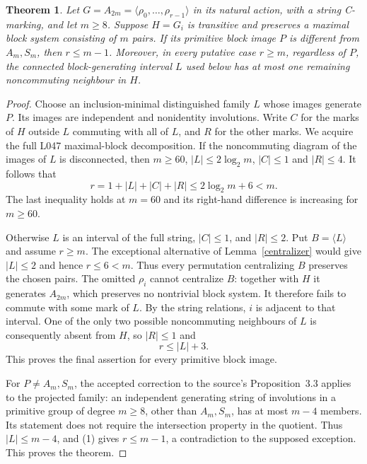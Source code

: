 \documentclass[11pt,a4paper]{article}
\newtheorem{theorem}[lemma]{Theorem}
\newcommand{\gen}[1]{\langle#1\rangle}
\begin{document}
\begin{theorem}\label{proper}
Let $G=A_{2m}=\gen{\rho_0,\ldots,\rho_{r-1}}$ in its
natural action, with a string C-marking, and let $m\ge8$.
Suppose $H=G_i$ is transitive and preserves a maximal block
system consisting of $m$ pairs. If its primitive block image
$P$ is different from $A_m,S_m$, then $r\le m-1$.
Moreover, in every putative case $r\ge m$, regardless of $P$,
the connected block-generating interval $L$ used below has
at most one remaining noncommuting neighbour in $H$.
\end{theorem}
\begin{proof}
Choose an inclusion-minimal distinguished family $L$ whose
images generate $P$. Its images are independent and nonidentity
involutions. Write $C$ for the marks of $H$ outside $L$
commuting with all of $L$, and $R$ for the other marks.
We acquire the full L047 maximal-block decomposition.
If the noncommuting diagram of the images of $L$ is disconnected,
then $m\ge60$, $|L|\le2\log_2m$, $|C|\le1$ and $|R|\le4$.
It follows that
\[
 r=1+|L|+|C|+|R|\le2\log_2m+6<m.
\]
The last inequality holds at $m=60$ and its right-hand difference
is increasing for $m\ge60$.

Otherwise $L$ is an interval of the full string, $|C|\le1$,
and $|R|\le2$. Put $B=\gen L$ and assume $r\ge m$.
The exceptional alternative of Lemma~\ref{centralizer} would
give $|L|\le2$ and hence $r\le6<m$. Thus every permutation
centralizing $B$ preserves the chosen pairs. The omitted
$\rho_i$ cannot centralize $B$: together with $H$ it generates
$A_{2m}$, which preserves no nontrivial block system.
It therefore fails to commute with some mark of $L$.
By the string relations, $i$ is adjacent to that interval.
One of the only two possible noncommuting neighbours of $L$
is consequently absent from $H$, so $|R|\le1$ and
\[
                         r\le |L|+3.                 \tag{1}
\]
This proves the final assertion for every primitive block image.

For $P\ne A_m,S_m$, the accepted correction to the source's
Proposition~3.3 applies to the projected family: an independent
generating string of involutions in a primitive group of degree
$m\ge8$, other than $A_m,S_m$, has at most $m-4$ members.
Its statement does not require the intersection property in the
quotient. Thus $|L|\le m-4$, and (1) gives $r\le m-1$,
a contradiction to the supposed exception. This proves the theorem.
\end{proof}
\end{document}
